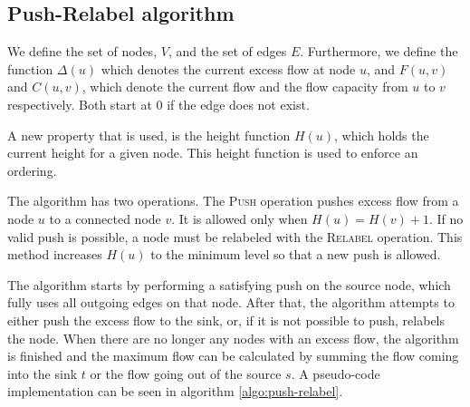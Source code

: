 \documentclass[10pt,a4paper,hidelinks]{article}
\begin{document}
\subsection{Push-Relabel algorithm}

We define the set of nodes, $V$, and the set of edges $E$. Furthermore, we define the function $\Delta(u)$ which denotes the current excess flow at node $u$, and $F(u, v)$ and $C(u, v)$, which denote the current flow and the flow capacity from $u$ to $v$ respectively. Both start at $0$ if the edge does not exist.

A new property that is used, is the height function $H(u)$, which holds the current height for a given node. This height function is used to enforce an ordering.

The algorithm has two operations. The \textsc{Push} operation pushes excess flow from a node $u$ to a connected node $v$. It is allowed only when $H(u) = H(v) + 1$. If no valid push is possible, a node must be relabeled with the \textsc{Relabel} operation. This method increases $H(u)$ to the minimum level so that a new push is allowed.

The algorithm starts by performing a satisfying push on the source node, which fully uses all outgoing edges on that node. After that, the algorithm attempts to either push the excess flow to the sink, or, if it is not possible to push, relabels the node. When there are no longer any nodes with an excess flow, the algorithm is finished and the maximum flow can be calculated by summing the flow coming into the sink $t$ or the flow going out of the source $s$. A pseudo-code implementation can be seen in algorithm \ref{algo:push-relabel}.
\end{document}
